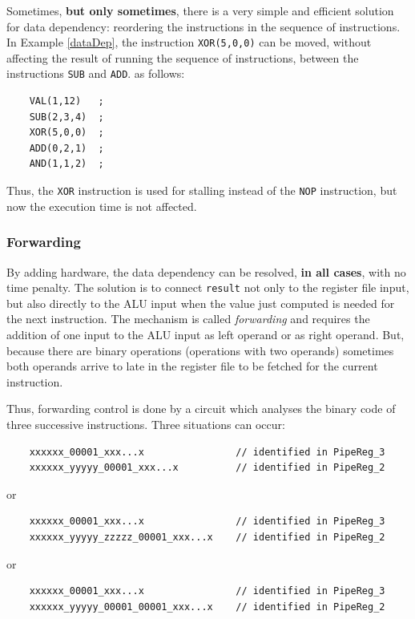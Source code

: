 Sometimes, {\bf but only sometimes}, there is a very simple and efficient solution for data dependency: reordering the instructions in the sequence of instructions. In Example \ref{dataDep}, the instruction {\tt XOR(5,0,0)} can be moved, without affecting the result of running the sequence of instructions, between the instructions {\tt SUB} and {\tt ADD}. as follows:
\begin{verbatim}
    VAL(1,12)   ;
    SUB(2,3,4)  ;
    XOR(5,0,0)  ;
    ADD(0,2,1)  ;
    AND(1,1,2)  ;
\end{verbatim}
Thus, the {\tt XOR} instruction is used for stalling instead of the {\tt NOP} instruction, but now the execution time is not affected.

\subsubsection{Forwarding}

By adding hardware, the data dependency can be resolved, {\bf in all cases}, with no time penalty. The solution is to connect {\tt result} not only to the register file input, but also directly to the ALU input when the value just computed is needed for the next instruction. The mechanism is called {\em forwarding} and requires the addition of one input to the  ALU input as left operand or as right operand. But, because there are binary operations (operations with two operands) sometimes both operands arrive to late in the register file to be fetched for the current instruction.

Thus, forwarding control is done by a circuit which analyses the binary code of three successive instructions. Three situations can occur:

\begin{verbatim}
    xxxxxx_00001_xxx...x                // identified in PipeReg_3
    xxxxxx_yyyyy_00001_xxx...x          // identified in PipeReg_2
\end{verbatim}
or
\begin{verbatim}
    xxxxxx_00001_xxx...x                // identified in PipeReg_3
    xxxxxx_yyyyy_zzzzz_00001_xxx...x    // identified in PipeReg_2
\end{verbatim}
or
\begin{verbatim}
    xxxxxx_00001_xxx...x                // identified in PipeReg_3
    xxxxxx_yyyyy_00001_00001_xxx...x    // identified in PipeReg_2
\end{verbatim}

